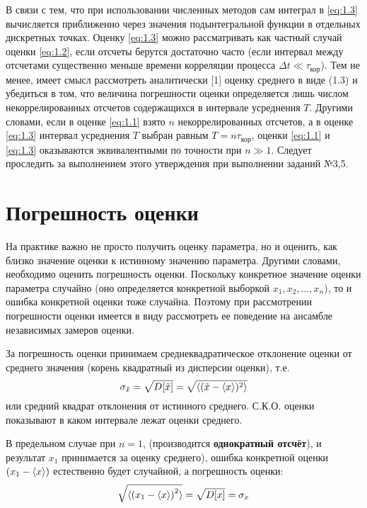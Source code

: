 \documentclass[a4paper,14pt]{extarticle}
\begin{document}
В связи с тем, что при использовании численных методов сам интеграл в \eqref{eq:1.3}
вычисляется приближенно через значения подынтегральной функции в отдельных дискретных точках. Оценку 
\eqref{eq:1.3}  можно рассматривать как частный случай оценки \eqref{eq:1.2},
если отсчеты берутся достаточно часто (если интервал между отсчетами существенно меньше 
времени корреляции процесса $\Delta t \ll \tau_{\text{кор}}$). Тем не менее, имеет смысл
рассмотреть аналитически [1] оценку среднего в виде (1.3) и убедиться в том, что величина
погрешности оценки определяется лишь числом некоррелированных отсчетов содержащихся в 
интервале усреднения $T$.
Другими словами, если в оценке \eqref{eq:1.1}  взято $n$ некоррелированных отсчетов, а в
оценке \eqref{eq:1.3}  интервал усреднения $T$ выбран равным $T = n \tau_{\text{кор}}$,
оценки \eqref{eq:1.1}  и \eqref{eq:1.3}  оказываются эквивалентными по точности при $n\gg 1$. Следует проследить за выполнением этого утверждения при выполнении заданий №3,5.

\section{Погрешность оценки}%
\label{sec:pogreshnost_otsenki}
На практике важно не просто получить оценку параметра, но и оценить, как близко значение оценки к истинному значению параметра. Другими словами, необходимо оценить погрешность оценки. Поскольку конкретное значение оценки параметра случайно (оно определяется конкретной выборкой $x_{1},x_{2},\dots,x_n$), то и ошибка конкретной оценки тоже случайна. Поэтому при рассмотрении погрешности оценки имеется в виду рассмотреть ее поведение на ансамбле независимых замеров оценки.

За погрешность оценки принимаем среднеквадратическое отклонение оценки от среднего
значения (корень квадратный из дисперсии оценки), т.е.
\begin{equation}
    \label{eq:2.1}
    \sigma_{\tilde x} = \sqrt{ D\qty[\tilde x]} = \sqrt{ \langle(\tilde x - \langle x\rangle)^2\rangle }
\end{equation}
или средний квадрат отклонения от истинного среднего. С.К.О. оценки показывают в каком интервале
лежат оценки среднего.

В предельном случае при $n=1$, (производится \textbf{однократный отсчёт}), и результат $x_{1}$ принимается за оценку среднего), ошибка конкретной оценки  $(x_{1}-\langle x\rangle)$ естественно будет случайной,
а погрешность оценки:
\begin{equation}
    \label{eq:2.2}
    \sqrt{ \langle \qty( x_{1} - \langle x\rangle )^2 \rangle } = \sqrt{D\qty[x]} = \sigma_x
\end{equation}
\end{document}

